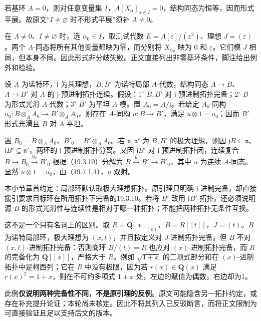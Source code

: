 若基环 $A=0$，则对任意变量集 $I$，$A[X_\alpha]_{\alpha\in I}=0$，结构同态为恒等，因而形式平展。故原文“$I\ne\varnothing$ 时不形式平展”须补 $A\ne0$。

在 $A\ne0$、$I\ne\varnothing$ 时，选 $\alpha_0\in I$，取测试代数 $E=A[\varepsilon]/(\varepsilon^2)$、理想 $J=(\varepsilon)$。两个 $A$-同态将所有其他变量都映为零，而分别将 $X_{\alpha_0}$ 映为 $0$ 和 $\varepsilon$。它们模 $J$ 相同，但本身不同。因此形式非分歧失败。正文直接列出非零基环条件，脚注给出例外和检验。

设 $A$ 为诺特环，$\mathfrak j$ 为其理想，$B,B'$ 为诺特局部 $A$-代数，结构同态 $A\to B$、$A\to B'$ 对 $A$ 的 $\mathfrak j$-预进制拓扑连续。假设：$1^\circ$ $B,B'$ 对 $\mathfrak j$-预进制拓扑完备；$2^\circ$ $B$ 为形式光滑 $A$-代数；$3^\circ$ $B'$ 为平坦 $A$-模。置 $A_0=A/\mathfrak j$。若给定 $A_0$-同构 $u_0:B\otimes_AA_0\to B'\otimes_AA_0$，则存在 $A$-同构 $u:B\to B'$，满足 $u\otimes1=u_0$；因而 $B'$ 形式光滑且 $B$ 对 $A$ 平坦。

置 $B_0=B\otimes_AA_0$、$B'_0=B'\otimes_AA_0$。若 $\mathfrak n,\mathfrak n'$ 为 $B,B'$ 的极大理想，则因 $\mathfrak jB\subseteq\mathfrak n$、$\mathfrak jB'\subseteq\mathfrak n'$，两环的 $\mathfrak j$-预进制拓扑分离。又因 $\mathfrak jB'$ 对 $\mathfrak j$-预进制拓扑闭，连续复合 $B\to B_0\xrightarrow{u_0}B'_0$ 根据（19.3.10）分解为 $B\xrightarrow{u}B'\to B'_0$，其中 $u$ 为连续 $A$-同态。显然 $u\otimes1=u_0$，由（19.7.1.4），$u$ 双射。

本小节章首约定：局部环默认取极大理想拓扑。原引理只明确 $\mathfrak j$-进制完备，却直接援引要求目标环在所用拓扑下完备的19.3.10。若将 $B'$ 改用 $\mathfrak jB'$-拓扑，还必须说明源 $B$ 的形式光滑性与连续性是相对于哪一种拓扑；不能把两种拓扑无条件互换。

这不是一个只有名词上的区别。取 $R=\mathbf Q[x]_{(x)}$，$B=R[[t]]$，$J=(t)$。$B$ 为诺特局部环，极大理想为 $(x,t)$，并且按定义对 $J$-进制拓扑完备。但 $B$ 不对 $(x,t)$-进制拓扑完备：否则商环 $B/(t)=R$ 也应对 $(x)$-进制拓扑完备，而 $R$ 的完备化为 $\mathbf Q[[x]]$，严格大于 $R$。例如 $\sqrt{1+x}$ 的二项式部分和在 $(x)$-进制拓扑中是柯西列；它在 $R$ 中没有极限，因为若 $r(x)\in\mathbf Q(x)$ 满足 $r(x)^2=1+x$，则在不可约多项式 $1+x$ 处，左边的赋值为偶数，右边却为1。

此例\textbf{仅说明两种完备性不同，不是原引理的反例}。原文可能隐含另一拓扑约定，或存在补充提升论证；本轮尚未核定。因此不将其列入已反驳断言，而将正文限制为可直接验证且足以支持后文的版本。

